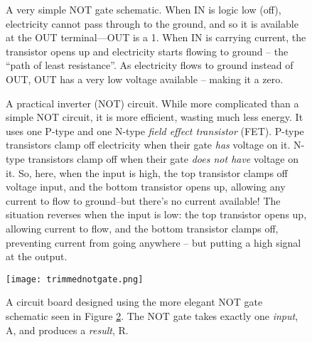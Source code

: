 \begin{figure}[!h]
\begin{center}

\caption{A very simple NOT gate schematic. When IN is logic low (off), electricity cannot pass through to the ground, and so it is available at the OUT terminal---OUT is a 1. When IN is carrying current, the transistor opens up and electricity starts flowing to ground -- the ``path of least resistance''. As electricity flows to ground instead of OUT, OUT has a very low voltage available -- making it a zero.}
\label{fig:simplenot}
\end{center}
\end{figure}


\begin{figure}[!ht]
\begin{center}


\caption{A practical inverter (NOT) circuit. While more complicated than a simple NOT circuit, it is more efficient, wasting much less energy. It uses one P-type and one N-type \emph{field effect transistor} (FET). P-type transistors clamp off electricity when their gate \emph{has} voltage on it. N-type transistors clamp off when their gate \emph{does not have} voltage on it. So, here, when the input is high, the top transistor clamps off voltage input, and the bottom transistor opens up, allowing any current to flow to ground--but there's no current available! The situation reverses when the input is low: the top transistor opens up, allowing current to flow, and the bottom transistor clamps off, preventing current from going anywhere -- but putting a high signal at the output.}
\label{fig:cmosnot}
\end{center}
\end{figure}


\begin{figure}[!ht]
\begin{center}
\texttt{[image: trimmednotgate.png]} %
\caption{A circuit board designed using the more elegant NOT gate schematic seen in Figure \ref{fig:cmosnot}. The NOT gate takes exactly one \emph{input}, A, and produces a \emph{result}, R.}
\label{fig:notgateboard}
\end{center}
\end{figure}

\begin{table}

\caption{The list of components needed to make the NOT gate seen in Figures \ref{fig:cmosnot} and \ref{fig:notgateboard}.}

\end{table}

